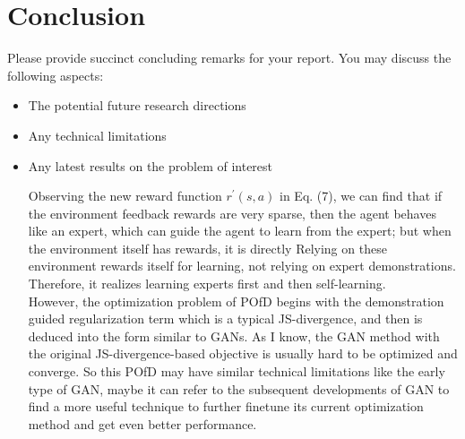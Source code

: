 
\section{Conclusion}
\label{section:conclusion}
Please provide succinct concluding remarks for your report. You may discuss the following aspects:
\begin{itemize}
    \item The potential future research directions 
    \item Any technical limitations 
    \item Any latest results on the problem of interest 

Observing the new reward function $r^{\prime}(s,a)$  in Eq. (7), we can find that if the environment feedback rewards are very sparse, then the agent behaves like an expert, which can guide the agent to learn from the expert; but when the environment itself has rewards, it is directly Relying on these environment rewards itself for learning, not relying on expert demonstrations. Therefore, it realizes learning experts first and then self-learning. \\
However, the optimization problem of POfD begins with the demonstration guided regularization term which is a typical JS-divergence, and then is deduced into the form similar to GANs. As I know, the GAN method with the original JS-divergence-based objective is usually hard to be optimized and converge. So this POfD may have similar technical limitations like the early type of GAN, maybe it can refer to the subsequent developments of GAN to find a more useful technique to further finetune its current optimization method and get even better performance.

    
    
\end{itemize}



